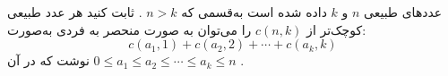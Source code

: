 \EXERCISE
عددهای طبیعی
$n$
و
$k$
داده شده است به‌قسمی که
$n > k$
. ثابت کنید هر عدد طبیعی کوچک‌تر از
$c(n, k)$
را می‌توان به صورت منحصر به فردی به‌صورت:
$$c(a_1, 1) + c(a_2, 2) + \cdots + c(a_k, k)$$
نوشت که در آن
$0 \leq a_1 \leq a_2 \leq \cdots \leq a_k \leq n$
.